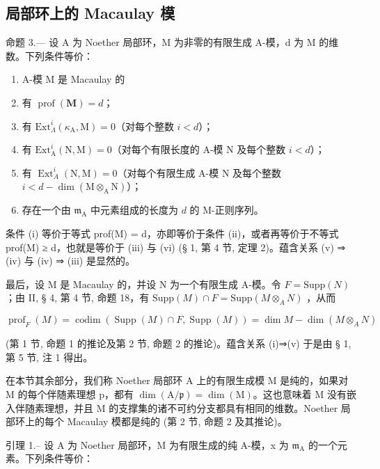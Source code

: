 \subsection{局部环上的 Macaulay 模}

命题 3.--- 设 A 为 Noether 局部环，M 为非零的有限生成 A-模，d 为 M 的维数。下列条件等价：

\begin{enumerate}
\def\labelenumi{(\roman{enumi})}
\item
  A-模 M 是 Macaulay 的
\item
  有 \(\operatorname{prof}(\mathbf{M}) = d\)；
\item
  有 \(\mathrm{Ext}_{\Lambda}^{i}(\kappa_{\mathrm{A}},\mathrm{M}) = 0\)（对每个整数 \(i < d\)）；
\item
  有 \(\mathrm{Ext}_{\mathrm{A}}^{i}(\mathrm{N},\mathrm{M}) = 0\)（对每个有限长度的 A-模 N 及每个整数 \(i < d\)）；
\item
  有 \(\operatorname{Ext}_A^i (\mathrm{N},\mathrm{M}) = 0\)（对每个有限生成 A-模 N 及每个整数 \(i < d - \dim (\mathrm{M}\otimes_{\mathrm{A}}\mathrm{N})\)）；
\item
  存在一个由 \(\mathfrak{m}_{\mathrm{A}}\) 中元素组成的长度为 \(d\) 的 M-正则序列。
\end{enumerate}

条件 (i) 等价于等式 prof(M) = d，亦即等价于条件 (ii)，或者再等价于不等式 prof(M) ≥ d，也就是等价于 (iii) 与 (vi) (§ 1, 第 4 节, 定理 2)。蕴含关系 (v) ⇒ (iv) 与 (iv) ⇒ (iii) 是显然的。

最后，设 M 是 Macaulay 的，并设 N 为一个有限生成 A-模。令 \(F = \text{Supp}(N)\)；由 II, § 4, 第 4 节, 命题 18，有 \(\text{Supp}(M) \cap F = \text{Supp}(M \otimes_{A} N)\) ，从而

\[
\operatorname{prof} _ {F} (M) = \operatorname{codim} (\operatorname{Supp} (M) \cap F, \operatorname{Supp} (M)) = \dim M - \dim (M \otimes_ {A} N)
\]

(第 1 节, 命题 1 的推论及第 2 节, 命题 2 的推论)。蕴含关系 (i)⇒(v) 于是由 § 1, 第 5 节, 注 1 得出。

在本节其余部分，我们称 Noether 局部环 A 上的有限生成模 M 是纯的，如果对 M 的每个伴随素理想 p，都有 \(\dim(\mathrm{A}/\mathfrak{p}) = \dim(\mathrm{M})\)。这也意味着 M 没有嵌入伴随素理想，并且 M 的支撑集的诸不可约分支都具有相同的维数。Noether 局部环上的每个 Macaulay 模都是纯的 (第 2 节, 命题 2 及其推论)。

引理 1.-- 设 A 为 Noether 局部环，M 为有限生成的纯 A-模，x 为 \(\mathfrak{m}_{\mathrm{A}}\) 的一个元素。下列条件等价：

